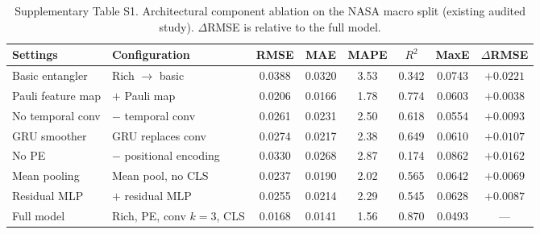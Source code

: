 \begin{table}[t]
\centering
\small
\caption{Supplementary Table S1. Architectural component ablation on the NASA macro split (existing audited study). $\Delta$RMSE is relative to the full model.}\label{tab:s1_arch}\label{tab:nasa_ablation}
\begin{tabular}{@{}llcccccc@{}}
\toprule
Settings & Configuration & RMSE & MAE & MAPE & $R^2$ & MaxE & $\Delta$RMSE \\
\midrule
Basic entangler & Rich $\rightarrow$ basic & 0.0388 & 0.0320 & 3.53 & 0.342 & 0.0743 & $+0.0221$ \\
Pauli feature map & $+$ Pauli map & 0.0206 & 0.0166 & 1.78 & 0.774 & 0.0603 & $+0.0038$ \\
No temporal conv & $-$ temporal conv & 0.0261 & 0.0231 & 2.50 & 0.618 & 0.0554 & $+0.0093$ \\
GRU smoother & GRU replaces conv & 0.0274 & 0.0217 & 2.38 & 0.649 & 0.0610 & $+0.0107$ \\
No PE & $-$ positional encoding & 0.0330 & 0.0268 & 2.87 & 0.174 & 0.0862 & $+0.0162$ \\
Mean pooling & Mean pool, no CLS & 0.0237 & 0.0190 & 2.02 & 0.565 & 0.0642 & $+0.0069$ \\
Residual MLP & $+$ residual MLP & 0.0255 & 0.0214 & 2.29 & 0.545 & 0.0628 & $+0.0087$ \\
Full model & Rich, PE, conv $k{=}3$, CLS & 0.0168 & 0.0141 & 1.56 & 0.870 & 0.0493 & --- \\
\bottomrule
\end{tabular}
\end{table}
